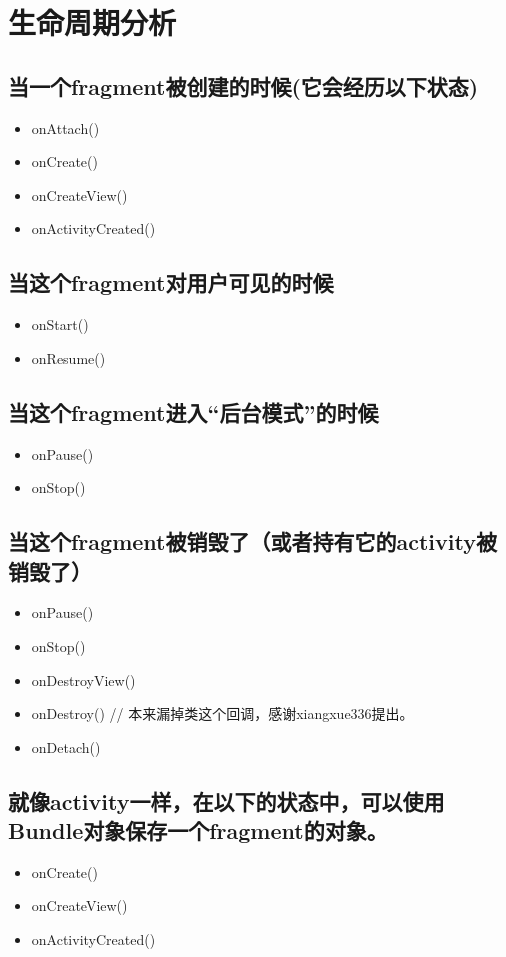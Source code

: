 \documentclass[9pt, b5paaper]{book}
\begin{document}
\section{生命周期分析}
\label{sec-3-5}
\subsection{当一个fragment被创建的时候(它会经历以下状态)}
\label{sec-3-5-1}
\begin{itemize}
\item onAttach()
\item onCreate()
\item onCreateView()
\item onActivityCreated()
\end{itemize}
\subsection{当这个fragment对用户可见的时候}
\label{sec-3-5-2}
\begin{itemize}
\item onStart()
\item onResume()
\end{itemize}
\subsection{当这个fragment进入“后台模式”的时候}
\label{sec-3-5-3}
\begin{itemize}
\item onPause()
\item onStop()
\end{itemize}
\subsection{当这个fragment被销毁了（或者持有它的activity被销毁了）}
\label{sec-3-5-4}
\begin{itemize}
\item onPause()
\item onStop()
\item onDestroyView()
\item onDestroy() // 本来漏掉类这个回调，感谢xiangxue336提出。
\item onDetach()
\end{itemize}
\subsection{就像activity一样，在以下的状态中，可以使用Bundle对象保存一个fragment的对象。}
\label{sec-3-5-5}
\begin{itemize}
\item onCreate()
\item onCreateView()
\item onActivityCreated()
\end{itemize}
\end{document}
